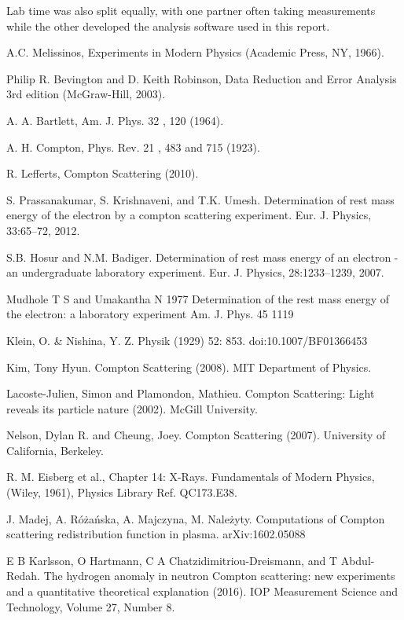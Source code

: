 \documentclass[%
 reprint,
 amsmath,amssymb,
 aps,
 pra,
]{revtex4-1}
\begin{document}
\noindent Lab time was also split equally, with one partner often taking measurements while the other developed the analysis software used in this report.

\begin{thebibliography}{6}
	
	A.C. Melissinos, Experiments in Modern Physics (Academic Press, NY, 1966).
	
	Philip R. Bevington and D. Keith Robinson, Data Reduction and Error Analysis 3rd edition (McGraw-Hill, 2003).

	A. A. Bartlett, Am. J. Phys. 32 , 120 (1964).
	
	A. H. Compton, Phys. Rev. 21 , 483 and 715 (1923).
	
	R. Lefferts, Compton Scattering (2010).
	
	 S. Prassanakumar, S. Krishnaveni, and T.K. Umesh. Determination of rest mass energy of the electron by a compton scattering experiment. Eur. J. Physics, 33:65–72, 2012.
	 
	S.B. Hosur and N.M. Badiger. Determination of rest mass energy of an electron - an undergraduate laboratory experiment. Eur. J. Physics, 28:1233–1239, 2007.
	
	Mudhole T S and Umakantha N 1977 Determination of the rest mass energy of the electron: a laboratory experiment Am. J. Phys. 45 1119
	
	Klein, O. \& Nishina, Y. Z. Physik (1929) 52: 853. doi:10.1007/BF01366453
	
	Kim, Tony Hyun. Compton Scattering (2008). MIT Department of Physics.
	
	Lacoste-Julien, Simon and Plamondon, Mathieu. Compton Scattering: Light reveals its particle nature (2002). McGill University.
	
	Nelson, Dylan R. and  Cheung, Joey. Compton Scattering (2007). University of California,  Berkeley.
	
	R. M. Eisberg et al., Chapter 14: X-Rays. Fundamentals of Modern Physics,  (Wiley, 1961), Physics Library Ref. QC173.E38.
	
	J. Madej, A. Różańska, A. Majczyna, M. Należyty. Computations of Compton scattering redistribution function in plasma. arXiv:1602.05088
	
	E B Karlsson, O Hartmann, C A Chatzidimitriou-Dreismann, and T Abdul-Redah. The hydrogen anomaly in neutron Compton scattering: new experiments and a quantitative theoretical explanation (2016). IOP Measurement Science and Technology, Volume 27, Number 8.


\end{thebibliography}
\end{document}
